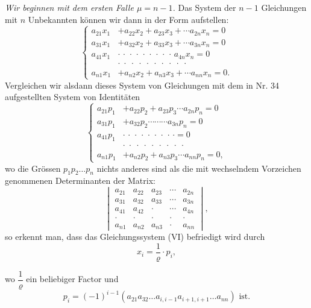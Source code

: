 \documentclass[11pt]{article}
\providecommand{\weberpage}[1]{}
\providecommand{\weq}[2]{\begin{equation}\tag{#1}#2\end{equation}}
\begin{document}
\textit{Wir beginnen mit dem ersten Falle $\mu = n - 1$.} Das System der
$n - 1$ Gleichungen mit $n$ Unbekannten k\"onnen wir dann in der Form
aufstellen:
\weq{VI}{
\left\{
\begin{aligned}
a_{21} x_1 &+ a_{22} x_2 + a_{23} x_3 + \cdots a_{2n} x_n = 0 \\
a_{31} x_1 &+ a_{32} x_2 + a_{33} x_3 + \cdots a_{3n} x_n = 0 \\
a_{41} x_1 &\cdot \, \cdot \, \cdot \, \cdot \, \cdot \, \cdot \, \cdot \, \cdot \, \cdot \, a_{4n} x_n = 0 \\
&\cdot \; \cdot \; \cdot \; \cdot \; \cdot \; \cdot \; \cdot \; \cdot \; \cdot \; \cdot \\
a_{n1} x_1 &+ a_{n2} x_2 + a_{n3} x_3 + \cdots a_{nn} x_n = 0.
\end{aligned}
\right.
}
Vergleichen wir alsdann dieses System von Gleichungen mit dem in Nr. 34
aufgestellten System von Identit\"aten
\weq{D}{
\left\{
\begin{aligned}
a_{21} p_1 &+ a_{22} p_2 + a_{23} p_3 \cdots a_{2n} p_n = 0 \\
a_{31} p_1 &+ a_{32} p_2 \cdots \cdots \cdots a_{3n} p_n = 0 \\
a_{41} p_1 &\cdot \, \cdot \, \cdot \, \cdot \, \cdot \, \cdot \, \cdot \, \cdot \, \cdot = 0 \\
&\cdot \; \cdot \; \cdot \; \cdot \; \cdot \; \cdot \; \cdot \; \cdot \; \cdot \\
a_{n1} p_1 &+ a_{n2} p_2 + a_{n3} p_3 \cdots a_{nn} p_n = 0,
\end{aligned}
\right.
}
wo die Gr\"ossen $p_1 p_2 \ldots p_n$ nichts anderes sind als die mit
wechselndem Vorzeichen genommenen Determinanten der Matrix:
\weq{A}{
\begin{vmatrix}
a_{21} & a_{22} & a_{23} & \cdots & a_{2n} \\
a_{31} & a_{32} & a_{33} & \cdots & a_{3n} \\
a_{41} & a_{42} & \cdot & \cdots & a_{4n} \\
\cdot & \cdot & \cdot & \cdot & \cdot \\
a_{n1} & a_{n2} & a_{n3} & \cdot & a_{nn}
\end{vmatrix},
}
so erkennt man, dass das Gleichungssystem (VI) befriedigt wird durch
\[
x_i = \frac{1}{\varrho} \cdot p_i,
\]


\weberpage{107}
wo $\dfrac{1}{\varrho}$ ein beliebiger Factor und
\[ p_i = (-1)^{i-1}(a_{21}a_{32}\ldots a_{i,i-1}a_{i+1,i+1}\ldots a_{nn}) \text{ ist.} \]
\end{document}
